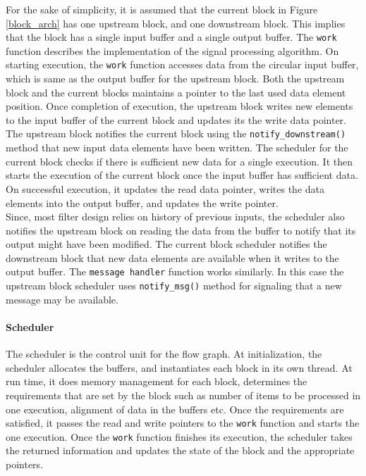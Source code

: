 For the sake of simplicity, it is assumed that the current block in Figure \ref{block_arch} has one upstream block, and one downstream block.
This implies that the block has a single input buffer and a single output buffer.
The \texttt{work} function describes the implementation of the signal processing algorithm.
On starting execution, the \texttt{work} function accesses data from the circular input buffer, which is same as the output buffer for the upstream block.
Both the upstream block and the current blocks maintains a pointer to the last used data element position. 
Once completion of execution, the upstream block writes new elements to the input buffer of the current block and updates its the write data pointer.
The upstream block notifies the current block using the \texttt{notify\_downstream()} method that new input data elements have been written.
The scheduler for the current block checks if there is sufficient new data for a single execution.
It then starts the execution of the current block once the input buffer has sufficient data.
On successful execution, it updates the read data pointer, writes the data elements into the output buffer, and updates the write pointer.\\

Since, most filter design relies on history of previous inputs, the scheduler also notifies the upstream block on reading the data from the buffer to notify that its output might have been modified.
The current block scheduler notifies the downstream block that new data elements are available when it writes to the output buffer.
The \texttt{message handler} function works similarly. In this case the upstream block scheduler uses \texttt{notify\_msg()} method for signaling that a new message may be available.\\



\paragraph{Scheduler}
The scheduler is the control unit for the flow graph.
At initialization, the scheduler allocates the buffers, and instantiates each block in its own thread.
At run time, it does memory management for each block, determines the requirements that are set by the block such as number of items to be processed in one execution, alignment of data in the buffers etc.
Once the requirements are satisfied, it passes the read and write pointers to the \texttt{work} function and starts the one execution.
Once the \texttt{work} function finishes its execution, the scheduler takes the returned information and updates the state of the block and the appropriate pointers.\\


